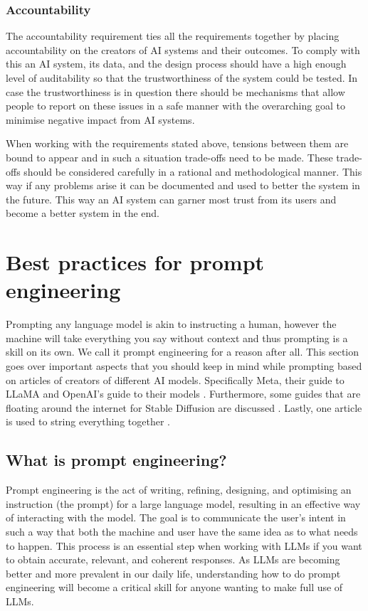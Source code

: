 \subsubsection*{Accountability}
The accountability requirement ties all the requirements together by placing accountability on the creators of AI systems and their outcomes. To comply with this an AI system, its data, and the design process should have a high enough level of auditability so that the trustworthiness of the system could be tested. In case the trustworthiness is in question there should be mechanisms that allow people to report on these issues in a safe manner with the overarching goal to minimise negative impact from AI systems.

When working with the requirements stated above, tensions between them are bound to appear and in such a situation trade-offs need to be made. These trade-offs should be considered carefully in a rational and methodological manner. This way if any problems arise it can be documented and used to better the system in the future. This way an AI system can garner most trust from its users and become a better system in the end.

\section{Best practices for prompt engineering}
Prompting any language model is akin to instructing a human, however the machine will take everything you say without context and thus prompting is a skill on its own. We call it prompt engineering for a reason after all. This section goes over important aspects that you should keep in mind while prompting based on articles of creators of different AI models. Specifically Meta, their guide to LLaMA \cite{MetaPrompting} and OpenAI's guide to their models \cite{OpenAIBestPractices}. Furthermore, some guides that are floating around the internet for Stable Diffusion are discussed \cite{SDPrompting,SDModels}. Lastly, one article is used to string everything together \cite{ekin2023prompt}.

\subsection{What is prompt engineering?}
Prompt engineering is the act of writing, refining, designing, and optimising an instruction (the prompt) for a large language model, resulting in an effective way of interacting with the model. The goal is to communicate the user's intent in such a way that both the machine and user have the same idea as to what needs to happen. This process is an essential step when working with LLMs if you want to obtain accurate, relevant, and coherent responses. As LLMs are becoming better and more prevalent in our daily life, understanding how to do prompt engineering will become a critical skill for anyone wanting to make full use of LLMs.

